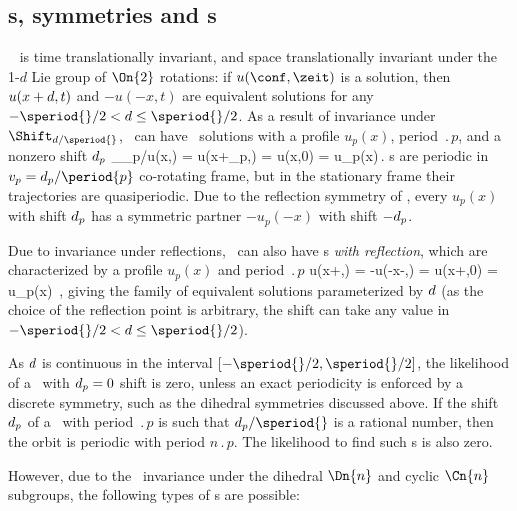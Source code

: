 
\subsection{\Rpo s, symmetries and \po s} \label{sec:KSePO}

\KSe\  is time translationally invariant, and
space translationally invariant under the 1-$d$ Lie group of $\On{2}$
rotations: if $u(\conf,\zeit)$ is a solution, then $u(x+d,t)$ and
$-u(-x,t)$ are equivalent solutions for any $-\speriod{}/2 < \shift \leq
\speriod{}/2$.
As a result of invariance under $\Shift_{\shift/\speriod{}}$,
\KSe\ can have \rpo\ solutions
with a profile $u_p(x)$, period $\period{p}$, and a
nonzero shift $d_p$
\beq
  \Shift_{\shift_p/\speriod{}}u(x,) =
  u(x+\shift_p,) = u(x,0) = u_p(x)\,.
\label{KSrpos}
\eeq
{\Rpo s}  are periodic in
$v_p=\shift_p/\period{p}$ co-rotating frame,
but in the stationary frame their
trajectories are quasiperiodic.  Due to the reflection symmetry
 of \KSe, every {\rpo} $u_p(x)$ with shift
$d_p$ has a symmetric partner $-u_p(-x)$ with shift $-d_p$.

Due to invariance under reflections, \KSe\ can also have
\rpo s {\em with reflection}, which are
characterized by a profile $u_p(x)$ and
period $\period{p}$
\beq
  \Refl u(x+\shift,) =
  -u(-x-\shift,) = u(x+\shift,0) = u_p(x)
  \,,
\label{KSpos}
\eeq
giving the family of equivalent solutions
parameterized by $d$
(as the choice of the reflection point is arbitrary,
the shift can take any value in $-\speriod{}/2 < \shift \leq \speriod{}/2$).

As $d$ is continuous in the interval $[-\speriod{}/2, \speriod{}/2]$,
the likelihood of a \rpo\ with $d_p = 0$ shift is zero,
unless an exact periodicity is enforced by a discrete symmetry,
such as the dihedral symmetries discussed above.
If the shift $d_p$ of a \rpo\ with period $\period{p}$ is such
that $\shift_p /\speriod{}$ is a rational number, then the orbit is
periodic with period $n\period{p}$.  The likelihood to find such \po s is
also zero.

However, due to the \KSe\ invariance under
the dihedral $\Dn{n}$ and cyclic $\Cn{n}$ subgroups, the following
types of \po s are possible:

